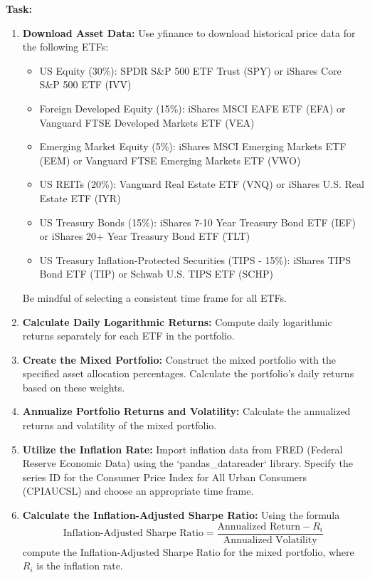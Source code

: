 \documentclass{article}
\begin{document}
\textbf{Task:}
\begin{enumerate}
    \item \textbf{Download Asset Data:} Use yfinance to download historical price data for the following ETFs:
    
    \begin{itemize}
        \item US Equity (30\%): SPDR S\&P 500 ETF Trust (SPY) or iShares Core S\&P 500 ETF (IVV)
        \item Foreign Developed Equity (15\%): iShares MSCI EAFE ETF (EFA) or Vanguard FTSE Developed Markets ETF (VEA)
        \item Emerging Market Equity (5\%): iShares MSCI Emerging Markets ETF (EEM) or Vanguard FTSE Emerging Markets ETF (VWO)
        \item US REITs (20\%): Vanguard Real Estate ETF (VNQ) or iShares U.S. Real Estate ETF (IYR)
        \item US Treasury Bonds (15\%): iShares 7-10 Year Treasury Bond ETF (IEF) or iShares 20+ Year Treasury Bond ETF (TLT)
        \item US Treasury Inflation-Protected Securities (TIPS - 15\%): iShares TIPS Bond ETF (TIP) or Schwab U.S. TIPS ETF (SCHP)
    \end{itemize}
    
    Be mindful of selecting a consistent time frame for all ETFs.
    
    \item \textbf{Calculate Daily Logarithmic Returns:} Compute daily logarithmic returns separately for each ETF in the portfolio.
    
    \item \textbf{Create the Mixed Portfolio:} Construct the mixed portfolio with the specified asset allocation percentages. Calculate the portfolio's daily returns based on these weights.
    
    \item \textbf{Annualize Portfolio Returns and Volatility:} Calculate the annualized returns and volatility of the mixed portfolio.
    
    \item \textbf{Utilize the Inflation Rate:} Import inflation data from FRED (Federal Reserve Economic Data) using the `pandas\_datareader` library. Specify the series ID for the Consumer Price Index for All Urban Consumers (CPIAUCSL) and choose an appropriate time frame.
    
    \item \textbf{Calculate the Inflation-Adjusted Sharpe Ratio:} Using the formula
    \begin{equation}
        \text{Inflation-Adjusted Sharpe Ratio} = \frac{\text{Annualized Return} - R_i}{\text{Annualized Volatility}}
    \end{equation}
    compute the Inflation-Adjusted Sharpe Ratio for the mixed portfolio, where \(R_i\) is the inflation rate.
    

\end{enumerate}
\end{document}
